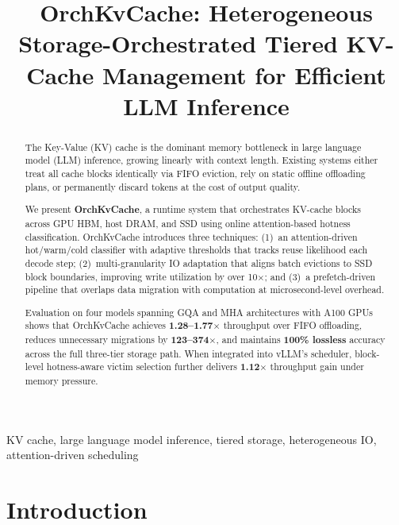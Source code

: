 \documentclass[conference]{IEEEtran}
\begin{document}
\title{OrchKvCache: Heterogeneous Storage-Orchestrated Tiered KV-Cache Management for Efficient LLM Inference}

\author{
}

\maketitle

\begin{abstract}
The Key-Value (KV) cache is the dominant memory bottleneck in large language model (LLM) inference, growing linearly with context length. Existing systems either treat all cache blocks identically via FIFO eviction, rely on static offline offloading plans, or permanently discard tokens at the cost of output quality.

We present \textbf{OrchKvCache}, a runtime system that orchestrates KV-cache blocks across GPU HBM, host DRAM, and SSD using online attention-based hotness classification. OrchKvCache introduces three techniques: (1)~an attention-driven hot/warm/cold classifier with adaptive thresholds that tracks reuse likelihood each decode step; (2)~multi-granularity IO adaptation that aligns batch evictions to SSD block boundaries, improving write utilization by over 10$\times$; and (3)~a prefetch-driven pipeline that overlaps data migration with computation at microsecond-level overhead.

Evaluation on four models spanning GQA and MHA architectures with A100 GPUs shows that OrchKvCache achieves \textbf{1.28--1.77$\times$} throughput over FIFO offloading, reduces unnecessary migrations by \textbf{123--374$\times$}, and maintains \textbf{100\% lossless} accuracy across the full three-tier storage path. When integrated into vLLM's scheduler, block-level hotness-aware victim selection further delivers \textbf{1.12$\times$} throughput gain under memory pressure.
\end{abstract}

\begin{IEEEkeywords}
KV cache, large language model inference, tiered storage, heterogeneous IO, attention-driven scheduling
\end{IEEEkeywords}

\section{Introduction}
\end{document}
